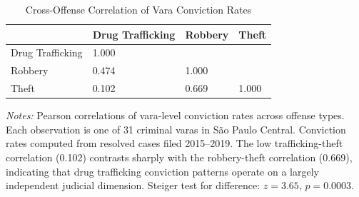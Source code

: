 \begin{table}[!h]
\centering
\caption{\label{tab:correlations}Cross-Offense Correlation of Vara Conviction Rates}
\centering
\begin{tabular}[t]{llll}
\toprule
  & Drug Trafficking & Robbery & Theft\\
\midrule
Drug Trafficking & 1.000 &  & \\
Robbery & 0.474 & 1.000 & \\
Theft & 0.102 & 0.669 & 1.000\\
\bottomrule
\end{tabular}
\end{table}
\begin{flushleft}\small
\textit{Notes:} Pearson correlations of vara-level conviction rates across offense types. Each observation is one of 31 criminal varas in S\~ao Paulo Central. Conviction rates computed from resolved cases filed 2015--2019. The low trafficking-theft correlation (0.102) contrasts sharply with the robbery-theft correlation (0.669), indicating that drug trafficking conviction patterns operate on a largely independent judicial dimension. Steiger test for difference: $z = 3.65$, $p = 0.0003$.
\end{flushleft}
